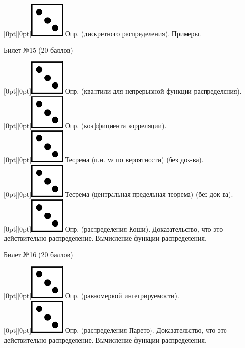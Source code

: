 \documentclass[preview]{standalone}
\begin{document}
\raisebox{-1pt}[0pt][0pt]{\includegraphics[width=0.02\linewidth]{3.png}} Опр. (дискретного распределения). Примеры. \\
\begin{center} {\Large Билет №15 (20 баллов)} \end{center}
\raisebox{-1pt}[0pt][0pt]{\includegraphics[width=0.02\linewidth]{3.png}}   Опр. (квантили для непрерывной функции распределения). \\
\raisebox{-1pt}[0pt][0pt]{\includegraphics[width=0.02\linewidth]{3.png}} Опр. (коэффициента корреляции). \\
\raisebox{-1pt}[0pt][0pt]{\includegraphics[width=0.02\linewidth]{3.png}} Теорема (п.н. vs по вероятности)  (без док-ва). \\
\raisebox{-1pt}[0pt][0pt]{\includegraphics[width=0.02\linewidth]{3.png}} Теорема (центральная предельная теорема) (без док-ва). \\
\raisebox{-1pt}[0pt][0pt]{\includegraphics[width=0.02\linewidth]{3.png}} Опр. (распределения Коши). Доказательство, что это действительно распределение. Вычисление функции распределения. \\
\begin{center} {\Large Билет №16 (20 баллов)} \end{center}
\raisebox{-1pt}[0pt][0pt]{\includegraphics[width=0.02\linewidth]{3.png}} Опр. (равномерной интегрируемости). \\
\raisebox{-1pt}[0pt][0pt]{\includegraphics[width=0.02\linewidth]{3.png}} Опр. (распределения Парето). Доказательство, что это действительно распределение. Вычисление функции распределения. \\
\end{document}
